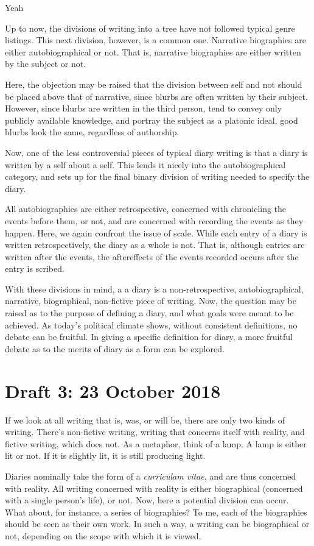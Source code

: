 Yeah \documentclass[12pt]{article}[titlepage]
\newcommand{\1}{\={a}}
\newcommand{\2}{\={e}}
\newcommand{\3}{\={\i}}
\newcommand{\4}{\=o}
\newcommand{\5}{\=u}
\newcommand{\6}{\={A}}
\renewcommand{\,}{\textsuperscript{,}}
\begin{document}
Up to now, the divisions of writing into a tree have not followed typical genre listings.
This next division, however, is a common one.
Narrative biographies are either autobiographical or not.
That is, narrative biographies are either written by the subject or not.

Here, the objection may be raised that the division between self and not should be placed above that of narrative, since blurbs are often written by their subject.
However, since blurbs are written in the third person, tend to convey only publicly available knowledge, and portray the subject as a platonic ideal, good blurbs look the same, regardless of authorship.

Now, one of the less controversial pieces of typical diary writing is that a diary is written by a self about a self.
This lends it nicely into the autobiographical category, and sets up for the final binary division of writing needed to specify the diary.

All autobiographies are either retrospective, concerned with chronicling the events before them, or not, and are concerned with recording the events as they happen.
Here, we again confront the issue of scale.
While each entry of a diary is written retrospectively, the diary as a whole is not.
That is, although entries are written after the events, the aftereffects of the events recorded occurs after the entry is scribed.

With these divisions in mind, a a diary is a non-retrospective, autobiographical, narrative, biographical, non-fictive piece of writing.
Now, the question may be raised as to the purpose of defining a diary, and what goals were meant to be achieved.
As today's political climate shows, without consistent definitions, no debate can be fruitful.
In giving a specific definition for diary, a more fruitful debate as to the merits of diary as a form can be explored.

\section{Draft 3: 23 October 2018}
If we look at all writing that is, was, or will be, there are only two kinds of writing.
There's non-fictive writing, writing that concerns itself with reality, and fictive writing, which does not.
As a metaphor, think of a lamp.
A lamp is either lit or not.
If it is slightly lit, it is still producing light.

Diaries nominally take the form of a \textit{curriculam vitae}, and are thus concerned with reality.
All writing concerned with reality is either biographical (concerned with a single person's life), or not.
Now, here a potential division can occur.
What about, for instance, a series of biographies?
To me, each of the biographies should be seen as their own work.
In such a way, a writing can be biographical or not, depending on the scope with which it is viewed.
\end{document}
